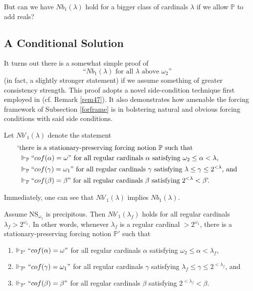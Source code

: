\documentclass[12pt]{article}
\numberwithin{equation}{section}
\begin{document}
But can we have $Nb_1(\lambda)$ hold for a bigger class of cardinals $\lambda$ if we allow $\mathbb{P}$ to add reals?

\subsection{A Conditional Solution}

It turns out there is a somewhat simple proof of $$\text{``} Nb_1(\lambda) \text{ for all } \lambda \text{ above } \omega_2 \text{''}$$ (in fact, a slightly stronger statement) if we assume something of greater consistency strength. This proof adopts a novel side-condition technique first employed in \cite{schindler} (cf. Remark \ref{rem47}). It also demonstrates how amenable the forcing framework of Subsection \ref{forframe} is in bolstering natural and obvious forcing conditions with said side conditions. 

\begin{defi}
Let $Nb'_1(\lambda)$ denote the statement
\begin{align*}
    \text{`} & \text{there is a stationary-preserving forcing notion } \mathbb{P} \text{ such that} \\ 
    & \Vdash_{\mathbb{P}} ``cof(\alpha) = \omega" \text{ for all regular cardinals } \alpha \text{ satisfying } \omega_2 \leq \alpha < \lambda \text{,} \\
    & \Vdash_{\mathbb{P}} ``cof(\gamma) = \omega_1" \text{ for all regular cardinals } \gamma \text{ satisfying } \lambda \leq \gamma \leq 2^{< \lambda} \text{, and} \\
    & \Vdash_{\mathbb{P}} ``cof(\beta) = \beta" \text{ for all regular cardinals } \beta \text{ satisfying } 2^{< \lambda} < \beta \text{'.}
\end{align*}
\end{defi}

Immediately, one can see that $Nb'_1(\lambda)$ implies $Nb_1(\lambda)$.

\begin{thm}\label{notion1}
Assume $\mathrm{NS}_{\omega_1}$ is precipitous. Then $Nb'_1(\lambda_f)$ holds for all regular cardinals $\lambda_f > 2^{\omega_1}$. In other words, whenever $\lambda_f$ is a regular cardinal $> 2^{\omega_1}$, there is a stationary-preserving forcing notion $\mathbb{P}'$ such that 
\begin{enumerate}[label=(\arabic*)]
    \item\label{cond1} $\Vdash_{\mathbb{P}'} ``cof(\alpha) = \omega"$ for all regular cardinals $\alpha$ satisfying $\omega_2 \leq \alpha < \lambda_f$,
    \item\label{cond2} $\Vdash_{\mathbb{P}'} ``cof(\gamma) = \omega_1"$ for all regular cardinals $\gamma$ satisfying $\lambda_f \leq \gamma \leq 2^{< \lambda_f}$, and
    \item\label{cond3} $\Vdash_{\mathbb{P}'} ``cof(\beta) = \beta"$ for all regular cardinals $\beta$ satisfying $2^{< \lambda_f} < \beta$.
\end{enumerate}
\end{thm}
\end{document}
